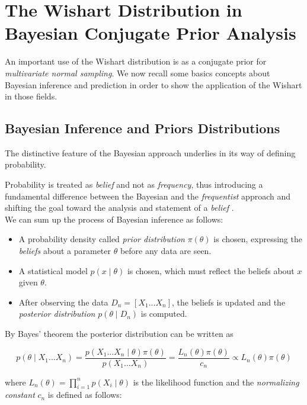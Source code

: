 \documentclass[12pt,openright,twoside,a4paper]{book}
\begin{document}
\section{The Wishart Distribution in Bayesian Conjugate Prior Analysis}

An important use of the Wishart distribution is as a conjugate prior for \textit{multivariate normal sampling}. We now recall some basics concepts about Bayesian inference and prediction in order to show the application of the Wishart in those fields.

\subsection{Bayesian Inference and Priors Distributions}

The distinctive feature of the Bayesian approach underlies in its way of defining probability.

Probability is treated as \textit{belief} and not as \textit{frequency}, thus introducing a fundamental difference between the Bayesian and the \textit{frequentist} approach and shifting the goal toward the analysis and statement of a \textit{belief} \cite{SML}.
\\[12pt]
We can sum up the process of Bayesian inference as follows:
\begin{itemize}
\item A probability density called \textit{prior distribution} $\pi(\theta)$ is chosen, expressing the \textit{beliefs} about a parameter $\theta$ before any data are seen.
\item A statistical model $p(x\mid \theta)$ is chosen, which must reflect the beliefs about $x$ given $\theta$.
\item After observing the data $D_n=[X_1...X_n]$, the beliefs is updated and the \textit{posterior distribution} $p(\theta\mid D_n)$ is computed.
\end{itemize}

By Bayes' theorem the posterior distribution can be written as 

\begin{equation}
p(\theta\mid X_1...X_n)= \frac{p(X_1...X_n\mid \theta)\pi(\theta)}{p(X_1...X_n)}=\frac{L_n(\theta)\pi(\theta)}{c_n}\propto L_n(\theta)\pi(\theta)
\label{bayest}
\end{equation}

where $L_n(\theta)=\prod_{i=1}^n p(X_i\mid \theta)$ is the likelihood function and the \textit{normalizing constant} $c_n$ is defined as follows:
\end{document}
